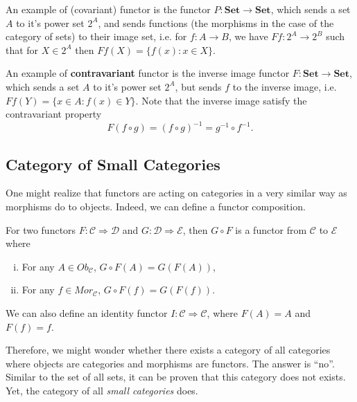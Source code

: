 \begin{example}
	An example of (covariant) functor is the functor
	$P : \mathbf{Set} \to \mathbf{Set}$, which sends a set $A$
	to it's power set $2^A$, and sends functions (the morphisms in the case
	of the category of sets) to their image set, i.e. for $f:A \to B$,
	we have $Ff:2^A \to 2^B$ such that for $X \in 2^A$ then $Ff(X) = \{f(x) : x \in X\}$.

	An example of \textbf{contravariant} functor is the inverse image functor
	$F : \mathbf{Set} \to \mathbf{Set}$, which sends a set $A$ to it's
	power set $2^A$, but sends $f$ to the inverse image, i.e.
	$Ff(Y) = \{x \in A : f(x) \in Y\}$.
	Note that the inverse image satisfy the contravariant property
	\begin{displaymath}
		F(f \circ g) = (f \circ g) ^{-1} = g^{-1} \circ f^{-1}.
	\end{displaymath}
\end{example}

\subsection{Category of Small Categories}

One might realize that functors are acting on categories in a very similar way as morphisms
do to objects. Indeed, we can define a functor composition.

\begin{definition}
	For two functors $F:\mathcal C \Rightarrow \mathcal D$
	and $G:\mathcal D \Rightarrow \mathcal E$, then $G \circ F$ is
	a functor from $\mathcal C$ to $\mathcal E$ where
	\begin{enumerate}[(i)]
		\item For any $A \in Ob_\mathcal C$, $G\circ F (A) = G(F(A))$,
		\item For any $f \in Mor_\mathcal C$, $G\circ F (f) = G(F(f))$.
	\end{enumerate}
\end{definition}
We can also define an identity functor $I:\mathcal C \Rightarrow \mathcal C$,
where $F(A) = A$ and $F(f) = f$.

Therefore, we might wonder whether there exists a category of all categories
where objects are categories and morphisms are functors.
The answer is ``no''. Similar to the set of all sets, it can be proven
that this category does not exists. Yet, the category of all \textit{small categories}
does.


